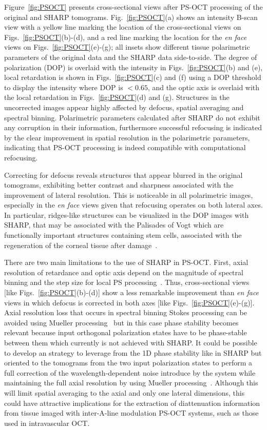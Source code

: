 Figure~\ref{fig:PSOCT} presents cross-sectional views after PS-OCT processing of the original and SHARP tomograms. Fig.~\ref{fig:PSOCT}(a) shows an intensity B-scan view with a yellow line marking the location of the cross-sectional views on Figs.~\ref{fig:PSOCT}(b)-(d), and a red line marking the location for the \textit{en face} views on Figs.~\ref{fig:PSOCT}(e)-(g); all insets show different tissue polarimetric parameters of the original data and the SHARP data side-to-side. The degree of polarization (DOP) is overlaid with the intensity in Figs.~\ref{fig:PSOCT}(b) and (e), local retardation is shown in Figs.~\ref{fig:PSOCT}(c) and (f) using a DOP threshold to display the intensity where DOP is $<0.65$, and the optic axis is overlaid with the local retardation in Figs.~\ref{fig:PSOCT}(d) and (g). Structures in the uncorrected images appear highly affected by defocus, spatial averaging and spectral binning. Polarimetric parameters calculated after SHARP do not exhibit any corruption in their information, furthermore successful refocusing is indicated by the clear improvement in spatial resolution in the polarimetric parameters, indicating that PS-OCT processing is indeed compatible with computational refocusing. 

Correcting for defocus reveals structures that appear blurred in the original tomograms, exhibiting better contrast and sharpness associated with the improvement of lateral resolution. This is noticeable in all polarimetric images, especially in the \textit{en face} views given that refocusing operates on both lateral axes. In particular, ridges-like structures can be visualized in the DOP images with SHARP, that may be associated with the Palisades of Vogt which are functionally important structures containing stem cells, associated with the regeneration of the corneal tissue after damage~\cite{Bizheva2017_Invivo}. 

There are two main limitations to the use of SHARP in PS-OCT. First, axial resolution of retardance and optic axis depend on the magnitude of spectral binning and the step size for local PS processing~\cite{Villiger2013_Spectral}. Thus, cross-sectional views [like Figs.~\ref{fig:PSOCT}(b)-(d)] show a less remarkable improvement than \textit{en face} views in which defocus is corrected in both axes [like Figs.~\ref{fig:PSOCT}(e)-(g)]. Axial resolution loss that occurs in spectral binning Stokes processing can be avoided using Mueller processing~\cite{Li2018_Robust} but in this case phase stability becomes relevant because input orthogonal polarization states have to be phase-stable between them which currently is not achieved with SHARP. It could be possible to develop an strategy to leverage from the 1D phase stability like in SHARP but oriented to the tomograms from the two input polarization states to perform a full correction of the wavelength-dependent noise introduce by the system while maintaining the full axial resolution by using Mueller processing~\cite{Li2018_Robust}. Although this will limit spatial averaging to the axial and only one lateral dimensions, this could have attractive implications for the extraction of diattenuation information from tissue imaged with inter-A-line modulation PS-OCT systems, such as those used in intravascular OCT.

